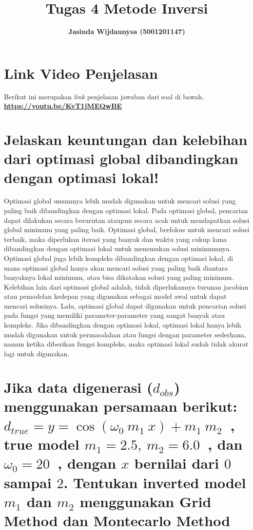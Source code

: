 \documentclass{article}
\title{\textbf{Tugas 4 Metode Inversi}}
\author{\textbf{Jasinda Wijdannysa (5001201147)}}
\affil{Departemen Fisika, Institut Teknologi Sepuluh Nopember}
\date{}
\begin{document}
\maketitle

\section*{Link Video Penjelasan}
Berikut ini merupakan \textit{link} penjelasan jawaban dari soal di bawah.\\
\href{https://youtu.be/KvT1jMEQwBE}{\textbf{\underline{https://youtu.be/KvT1jMEQwBE}}}


\section{Jelaskan keuntungan dan kelebihan dari optimasi global dibandingkan dengan optimasi lokal!}
Optimasi global umumnya lebih mudah digunakan untuk mencari solusi yang paling baik dibandingkan dengan optimasi lokal.
Pada optimasi global, pencarian dapat dilakukan secara berurutan ataupun secara acak untuk mendapatkan solusi global minimum yang paling baik.
Optimasi global, berfokus untuk mencari solusi terbaik, maka diperlukan iterasi yang banyak dan waktu yang cukup lama dibandingkan dengan optimasi lokal untuk menemukan solusi minimumnya.
Optimasi global juga lebih kompleks dibandingkan dengan optimasi lokal, di mana optimasi global hanya akan mencari solusi yang paling baik diantara banyaknya lokal minimum, atau bisa dikatakan solusi yang paling minimum.
Kelebihan lain dari optimasi global adalah, tidak diperlukannya turunan jacobian atau pemodelan kedepan yang digunakan sebagai model awal untuk dapat mencari solusinya.
Lalu, optimasi global dapat digunakan untuk pencarian solusi pada fungsi yang memiliki parameter-parameter yang sangat banyak atau kompleks.
Jika dibandingkan dengan optimasi lokal, optimasi lokal hanya lebih mudah digunakan untuk permasalahan atau fungsi dengan parameter sederhana, namun ketika diberikan fungsi kompleks, maka optimasi lokal sudah tidak akurat lagi untuk digunakan.


\bigskip
\section{Jika data digenerasi ($d_{obs}$) menggunakan persamaan berikut: \\
$d_{true}=y=\cos(\omega_0 \ m_1 \ x) + m_1 \ m_2$\ , true model $m_1=2.5, \ m_2=6.0$\ , dan $\omega_0=20$\ , dengan $x$ bernilai dari $0$ sampai $2$. Tentukan inverted model $m_1$ dan $m_2$ menggunakan Grid Method dan Montecarlo Method}
\end{document}
